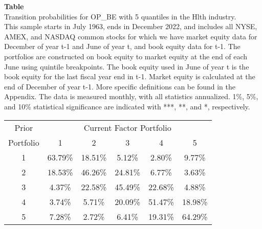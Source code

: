 \begin{table*}[ht!]
\raggedright
{}
\label{tab: transition_probs_OP_BE_Hlth_with_5_quantiles}
\textbf{Table \thetable} \\
Transition probabilities for OP_BE with 5 quantiles in the Hlth industry. \\
\hspace*{1em}This sample starts in July 1963, ends in December 2022, and includes all NYSE, AMEX, and NASDAQ common stocks for which we have market equity data for December of year t-1 and June of year t, and book equity data for t-1. The portfolios are constructed on book equity to market equity at the end of each June using quintile breakpoints.  The book equity used in June of year t is the book equity for the last fiscal year end in t-1.  Market equity is calculated at the end of December of year t-1.  More specific definitions can be found in the Appendix.  The data is measured monthly, with all statistics annualized.  1\%, 5\%, and 10\% statistical significance are indicated with ***, **, and *, respectively. \\
\vspace{0.5em}
\centering
\begin{adjustbox}{max width=\textwidth}
\begin{tabular}{@{}cccccc@{}}
\toprule
Prior & \multicolumn{5}{c}{Current Factor Portfolio} \\
Portfolio & 1 & 2 & 3 & 4 & 5 \\
\midrule
1 & 63.79\% & 18.51\% & 5.12\% & 2.80\% & 9.77\% \\
2 & 18.53\% & 46.26\% & 24.81\% & 6.77\% & 3.63\% \\
3 & 4.37\% & 22.58\% & 45.49\% & 22.68\% & 4.88\% \\
4 & 3.74\% & 5.71\% & 20.09\% & 51.47\% & 18.98\% \\
5 & 7.28\% & 2.72\% & 6.41\% & 19.31\% & 64.29\% \\
\bottomrule
\end{tabular}
\end{adjustbox}
\end{table*}